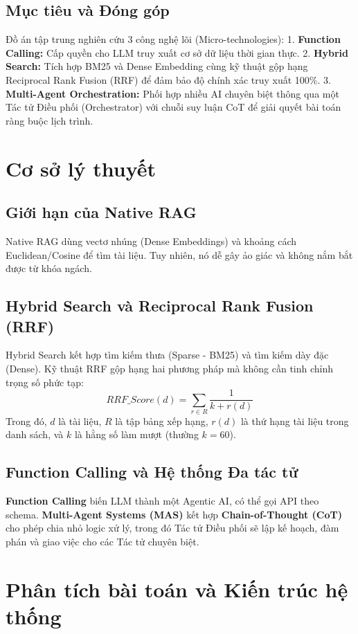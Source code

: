 \documentclass[12pt,a4paper]{report}
\begin{document}
\section{Mục tiêu và Đóng góp}
Đồ án tập trung nghiên cứu 3 công nghệ lõi (Micro-technologies):
1. \textbf{Function Calling:} Cấp quyền cho LLM truy xuất cơ sở dữ liệu thời gian thực.
2. \textbf{Hybrid Search:} Tích hợp BM25 và Dense Embedding cùng kỹ thuật gộp hạng Reciprocal Rank Fusion (RRF) để đảm bảo độ chính xác truy xuất 100\%.
3. \textbf{Multi-Agent Orchestration:} Phối hợp nhiều AI chuyên biệt thông qua một Tác tử Điều phối (Orchestrator) với chuỗi suy luận CoT để giải quyết bài toán ràng buộc lịch trình.

\chapter{Cơ sở lý thuyết}
\section{Giới hạn của Native RAG}
Native RAG dùng vectơ nhúng (Dense Embeddings) và khoảng cách Euclidean/Cosine để tìm tài liệu. Tuy nhiên, nó dễ gây ảo giác và không nắm bắt được từ khóa ngách.

\section{Hybrid Search và Reciprocal Rank Fusion (RRF)}
Hybrid Search kết hợp tìm kiếm thưa (Sparse - BM25) và tìm kiếm dày đặc (Dense). Kỹ thuật RRF gộp hạng hai phương pháp mà không cần tinh chỉnh trọng số phức tạp:
\begin{equation}
    RRF\_Score(d) = \sum_{r \in R} \frac{1}{k + r(d)}
\end{equation}
Trong đó, $d$ là tài liệu, $R$ là tập bảng xếp hạng, $r(d)$ là thứ hạng tài liệu trong danh sách, và $k$ là hằng số làm mượt (thường $k=60$).

\section{Function Calling và Hệ thống Đa tác tử}
\textbf{Function Calling} biến LLM thành một Agentic AI, có thể gọi API theo schema. \textbf{Multi-Agent Systems (MAS)} kết hợp \textbf{Chain-of-Thought (CoT)} cho phép chia nhỏ logic xử lý, trong đó Tác tử Điều phối sẽ lập kế hoạch, đàm phán và giao việc cho các Tác tử chuyên biệt.

\chapter{Phân tích bài toán và Kiến trúc hệ thống}
\end{document}
